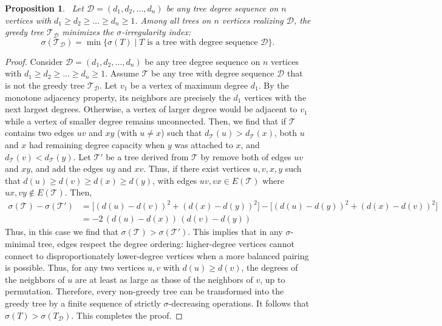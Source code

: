 \documentclass[12pt, a4paper]{article}
\theoremstyle{plain}  %
\newtheorem{proposition}{Proposition}[section]
\theoremstyle{definition}  %
\newcommand{\TT}{\mathcal{T}}
\begin{document}
\begin{proposition}~\label{jas-pron1}
Let $\mathscr{D}=(d_1,d_2,\dots,d_n)$ be any tree degree sequence on $n$ vertices with $d_1\geqslant d_2\geqslant \dots\geqslant d_n\geqslant 1$. Among all trees on $n$ vertices realizing $\mathscr{D}$, the greedy tree $\TT_\mathscr{D}$ minimizes the $\sigma$-irregularity index:
\[
\sigma(\TT_\mathscr{D}) = \min \bigl\{ \sigma(T) \mid T \text{ is a tree with degree sequence } \mathscr{D} \bigr\}.
\]
\end{proposition}
\begin{proof}
Consider $\mathscr{D}=(d_1,d_2,\dots,d_n)$ be any tree degree sequence on $n$ vertices with $d_1\geqslant d_2\geqslant \dots\geqslant d_n\geqslant 1$. Assume $\TT$ be any tree with degree sequence $\mathscr{D}$ that is not the greedy tree $\TT_\mathscr{D}$. Let $v_1$ be a vertex of maximum degree $d_1$. By the monotone adjacency property, its neighbors are precisely the $d_1$ vertices with the next largest degrees. Otherwise, a vertex of larger degree would be adjacent to $v_1$ while a vertex of smaller degree remains unconnected.
Then, we find that if $\TT$ contains two edges $uv$ and $xy$ (with $u \neq x$) such that $d_\TT(u)>d_\TT(x)$, both $u$ and $x$ had remaining degree capacity when $y$ was attached to $x$, and $d_\TT(v)<d_\TT(y)$.
Let $\TT'$ be a tree derived from $\TT$ by remove both of edges $uv$ and $xy$, and add the edges $uy$ and $xv$. Thus, if there exist vertices $u,v,x,y$ such that $d(u) \geq d(v) \geq d(x) \geq d(y)$,
with edges $uv, vx \in E(\TT)$ where $ux, vy \notin E(\TT)$. Then, 
\begin{align*}
 \sigma(\TT)-\sigma(\TT') & = \bigl[(d(u)-d(v))^2+(d(x)-d(y))^2\bigr]-\bigl[(d(u)-d(y))^2+(d(x)-d(v))^2\bigr]\\
 &=-2\,(d(u)-d(x))\,(d(v)-d(y))
\end{align*}
Thus, in this case we find that $\sigma(\TT)>\sigma(\TT')$. This implies that in any $\sigma$-minimal tree, edges respect the degree ordering: higher-degree vertices cannot connect to disproportionately lower-degree vertices when a more balanced pairing is possible. 
Thus, for any two vertices $u,v$ with $d(u) \geq d(v)$, the degrees of the neighbors of $u$ are at least as large as those of the neighbors of $v$, up to permutation.
Therefore, every non-greedy tree can be transformed into the greedy tree by a finite sequence of strictly $\sigma$-decreasing operations. It follows that $\sigma(T)>\sigma(T_\mathscr{D})$. 
This completes the proof.
\end{proof}
\end{document}
